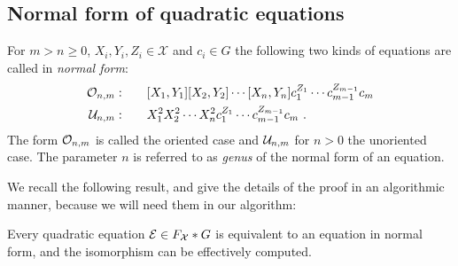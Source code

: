 \documentclass[a4paper,11pt]{amsart}
\begin{document}
\subsection{Normal form of quadratic equations} \label{sec:normal_form}
\begin{defi}
  For $m>n\ge0$, $X_i,Y_i,Z_i \in\mathcal{X}$ and $c_i \in G$ the following two kinds of
  equations are called in \emph{normal form}:
 \begin{align}
  \mathcal{O}_{n,m}:\qquad & [X_1,Y_1][X_2,Y_2]\cdots[X_n,Y_n]c_1^{Z_1}\cdots c_{m-1}^{Z_{m-1}}c_m  \\
   \mathcal{U}_{n,m}:\qquad & X_1^2X_2^2\cdots X_n^2 c_1^{Z_1}\cdots c_{m-1}^{Z_{m-1}}c_m\ .
 \end{align} 
 The form $\mathcal{O}_{n,m}$ is called the oriented case and $\mathcal{U}_{n,m}$ for
 $n>0$ the unoriented case.  The parameter $n$ is referred to as
 \emph{genus} of the normal form of an equation.
\end{defi}

We recall the following result, and 
give the details of the proof in an algorithmic manner, because we will need them in our algorithm:
\begin{thm} \label{Thm:equationNormalForm}
  Every quadratic equation $\mathcal{E} \in F_{\mathcal{X}}*G$ is equivalent to an equation
  in normal form, and the isomorphism can be effectively computed.
\end{thm}
\end{document}

